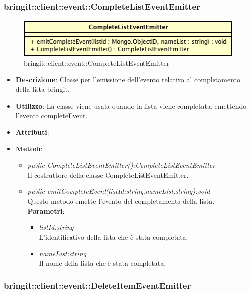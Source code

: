 \subsubsection{bringit::client::event::CompleteListEventEmitter}

\label{bringit::client::event::CompleteListEventEmitter}
\begin{figure}[H]
	\centering
	\includegraphics[scale=0.5]{Sezioni/SottosezioniST/img/app/CompleteListEventEmitter.png}
	\caption{bringit::client::event::CompleteListEventEmitter}
\end{figure}

\begin{itemize}
\item \textbf{Descrizione}: Classe per l'emissione dell'evento relativo al completamento della lista bringit.
\item \textbf{Utilizzo}: La classe viene usata quando la lista viene completata, emettendo l'evento completeEvent.
\item \textbf{Attributi}: 
\item \textbf{Metodi}:
	\begin{itemize}
	\item \textit{public CompleteListEventEmitter():CompleteListEventEmitter}\\
	Il costruttore della classe CompleteListEventEmitter.
	\item \textit{public emitCompleteEvent(listId:string,nameList:string):void}\\
	Questo metodo emette l'evento del completamento della lista.
					\\ \textbf{Parametri}: \begin{itemize}
			\item \textit{listId:string}\\
			L'identificativo della lista che è stata completata.
			\item \textit{nameList:string}\\
			Il nome della lista che è stata completata.
					\end{itemize}
	\end{itemize}
\end{itemize}


\subsubsection{bringit::client::event::DeleteItemEventEmitter}

